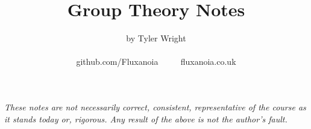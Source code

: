 \documentclass[a4paper, 12pt, twoside]{article}
\begin{document}
\title{Group Theory Notes}
\date{}
\author{by Tyler Wright \\
  \\
  github.com/Fluxanoia $\qquad$ fluxanoia.co.uk
}
\maketitle

\vfill

\textit{These notes are not necessarily correct,
consistent, representative of the course as it stands today or, 
rigorous. Any result of the above is not the author's fault.}

\addtocounter{section}{-1}



\newpage

\tableofcontents


\end{document}
